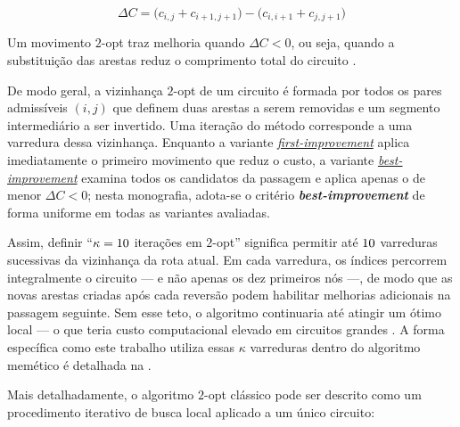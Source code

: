 \begin{equation}\label{eq:delta-2opt}
      \Delta C = \bigl(c_{i,j} + c_{i+1,j+1}\bigr) - \bigl(c_{i,i+1} + c_{j,j+1}\bigr)
\end{equation}

Um movimento \(2\)-opt traz melhoria quando \(\Delta C < 0\), ou seja, quando a substituição das arestas reduz o comprimento total do circuito \autocite{croes1958method}.

De modo geral, a vizinhança \(2\)-opt de um circuito é formada por todos os pares admissíveis \((i,j)\) que definem duas arestas a serem removidas e um segmento intermediário a ser invertido.
Uma iteração do método corresponde a uma varredura dessa vizinhança.
Enquanto a variante \hyperlink{term:first-improvement}{\emph{first-improvement}} aplica imediatamente o primeiro movimento que reduz o custo, a variante \hyperlink{term:best-improvement}{\emph{best-improvement}} examina todos os candidatos da passagem e aplica apenas o de menor \(\Delta C < 0\); nesta monografia, adota-se o critério \textbf{\emph{best-improvement}} de forma uniforme em todas as variantes avaliadas.

Assim, definir ``\(\kappa = 10\) iterações em \(2\)-opt'' significa permitir até \(10\) varreduras sucessivas da vizinhança da rota atual.
Em cada varredura, os índices percorrem integralmente o circuito --- e não apenas os dez primeiros nós ---, de modo que as novas arestas criadas após cada reversão podem habilitar melhorias adicionais na passagem seguinte.
Sem esse teto, o algoritmo continuaria até atingir um ótimo local --- o que teria custo computacional elevado em circuitos grandes \autocite{lin1973efficient}.
A forma específica como este trabalho utiliza essas \(\kappa\) varreduras dentro do algoritmo memético é detalhada na .

Mais detalhadamente, o algoritmo \(2\)-opt clássico pode ser descrito como um procedimento iterativo de busca local aplicado a um único circuito:


